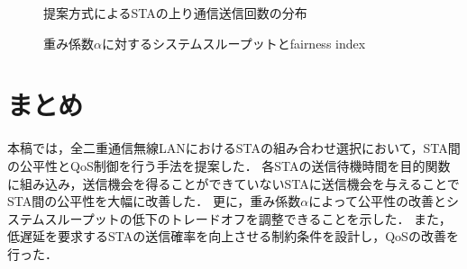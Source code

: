 \documentclass[twocolumn, a4paper]{ieicejsp}
\begin{document}
		\begin{figure}[t]
			\centering
			\caption{提案方式によるSTAの上り通信送信回数の分布}
			\label{fig:fair}
		\end{figure}

		\begin{figure}[t]
			\centering
			\caption{重み係数$\alpha$に対するシステムスループットとfairness index}
			\label{fig:thr_fair}
		\end{figure}

\section{まとめ}
	本稿では，全二重通信無線LANにおけるSTAの組み合わせ選択において，STA間の公平性とQoS制御を行う手法を提案した．
	各STAの送信待機時間を目的関数に組み込み，送信機会を得ることができていないSTAに送信機会を与えることで
	STA間の公平性を大幅に改善した．
	更に，重み係数$\alpha$によって公平性の改善とシステムスループットの低下のトレードオフを調整できることを示した．
	また，低遅延を要求するSTAの送信確率を向上させる制約条件を設計し，QoSの改善を行った．



\end{document}
